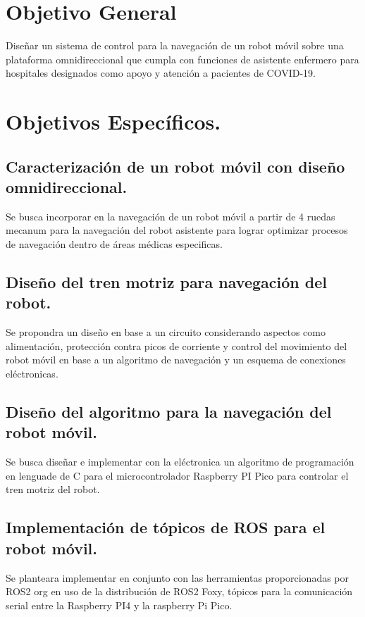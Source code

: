 \documentclass[12pt]{book} %
\begin{document}
\section{Objetivo General}
Diseñar un sistema de control para la navegación de un robot móvil sobre una plataforma omnidireccional que cumpla con funciones de asistente enfermero para hospitales designados como apoyo y atención a pacientes de COVID-19.

\section{Objetivos Específicos.}
\subsection{Caracterización de un robot móvil con diseño omnidireccional.}
Se busca incorporar en la navegación de un robot móvil a partir de 4 ruedas mecanum para la navegación del robot asistente para lograr optimizar procesos de navegación dentro de áreas médicas especificas.


\subsection{Diseño del tren motriz para navegación del robot.}
Se propondra un diseño en base a un circuito considerando aspectos como alimentación, protección contra picos de corriente y control del movimiento del robot móvil en base a un algoritmo de navegación y un esquema de conexiones eléctronicas.

\subsection{Diseño del algoritmo para la navegación del robot móvil.}

Se busca diseñar e implementar con la eléctronica un algoritmo de programación en lenguade de C para el microcontrolador Raspberry PI Pico para controlar el tren motriz del robot.

\subsection{Implementación de tópicos de ROS para el robot móvil.}
Se planteara implementar en conjunto con las herramientas proporcionadas por ROS2 org en uso de la distribución de ROS2 Foxy, tópicos para la comunicación serial entre la Raspberry PI4 y la raspberry Pi Pico.
\end{document}
